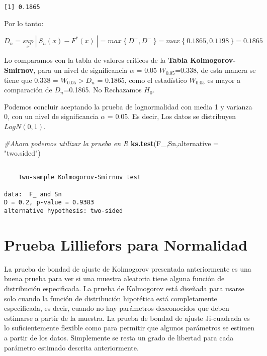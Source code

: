 \documentclass[
  a4paper,
  oneside,
  openany]{book}
\newenvironment{Shaded}{\begin{snugshade}}{\end{snugshade}}
\newcommand{\AttributeTok}[1]{\textcolor[rgb]{0.13,0.29,0.53}{#1}}
\newcommand{\CommentTok}[1]{\textcolor[rgb]{0.56,0.35,0.01}{\textit{#1}}}
\newcommand{\FunctionTok}[1]{\textcolor[rgb]{0.13,0.29,0.53}{\textbf{#1}}}
\newcommand{\NormalTok}[1]{#1}
\newcommand{\StringTok}[1]{\textcolor[rgb]{0.31,0.60,0.02}{#1}}
\begin{document}
\begin{verbatim}
[1] 0.1865
\end{verbatim}

Por lo tanto:

\[D_{n}=\underset{x}{sup} \ | \ S_{n}(x)-F^*(x)\ |=max\ \{\ D^+,D^- \ \}=max \ \{ \ 0.1865,0.1198 \ \}=0.1865\]

Lo comparamos con la tabla de valores críticos de la \textbf{Tabla Kolmogorov-Smirnov}, para un nivel de significancia \(\alpha\) = 0.05
\(W_{0.05}\)=0.338, de esta manera se tiene que 0.338 = \(W_{0.05} > D_{n}\) = 0.1865, como el estadístico \(W_{0.05}\) es mayor a comparación de \(D_{n}\)=0.1865.
No Rechazamos \(H_0\).

Podemos concluir aceptando la prueba de lognormalidad con media 1 y varianza 0, con un nivel de significancia \(\alpha\) = 0.05. Es decir, Los datos se distribuyen \(LogN(0,1)\).

\begin{Shaded}
\begin{Highlighting}[]
\CommentTok{\#Ahora podemos utilizar la prueba en R}
\FunctionTok{ks.test}\NormalTok{(F\_,Sn,}\AttributeTok{alternative =} \StringTok{"two.sided"}\NormalTok{)}
\end{Highlighting}
\end{Shaded}

\begin{verbatim}

    Two-sample Kolmogorov-Smirnov test

data:  F_ and Sn
D = 0.2, p-value = 0.9383
alternative hypothesis: two-sided
\end{verbatim}

\hypertarget{prueba-lilliefors-para-normalidad}{%
\chapter{Prueba Lilliefors para Normalidad}\label{prueba-lilliefors-para-normalidad}}

La prueba de bondad de ajuste de Kolmogorov presentada anteriormente es una buena prueba para ver si una muestra aleatoria tiene alguna función de distribución especificada. La prueba de Kolmogorov está diseñada para usarse solo cuando la función de distribución hipotética está completamente especificada, es decir, cuando no hay parámetros desconocidos que deben estimarse a partir de la muestra.
La prueba de bondad de ajuste Ji-cuadrada es lo suficientemente flexible como para permitir que algunos parámetros se estimen a partir de los datos. Simplemente se resta un grado de libertad para cada parámetro estimado descrita anteriormente.
\end{document}

